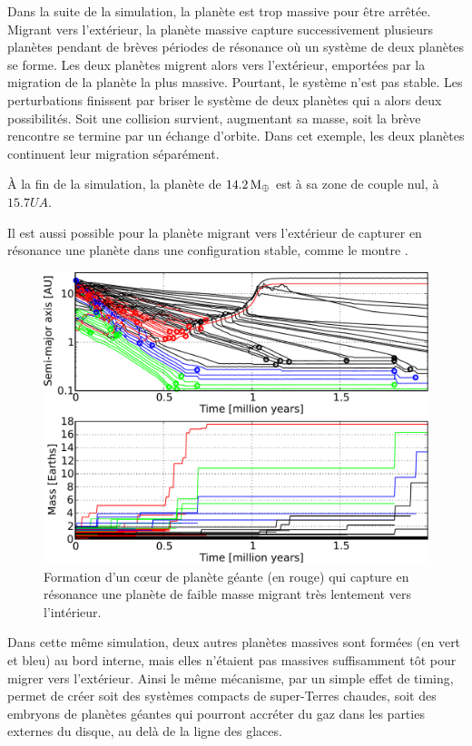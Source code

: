Dans la suite de la simulation, la planète est trop massive pour être arrêtée. Migrant vers l'extérieur, la planète massive
capture successivement plusieurs planètes pendant de brèves périodes de résonance où un système de deux planètes se forme. Les
deux planètes migrent alors vers l'extérieur, emportées par la migration de la planète la plus massive. Pourtant, le système
n'est pas stable. Les perturbations finissent par briser le système de deux planètes qui a alors deux possibilités. Soit une
collision survient, augmentant sa masse, soit la brève rencontre se termine par un échange d'orbite. Dans cet exemple, les deux
planètes continuent leur migration séparément.

À la fin de la simulation, la planète de $14.2\mathrm{\thinspace M_\oplus}$ est à sa zone de couple nul, à $15.7\unit{UA}$. 

\bigskip

Il est aussi possible pour la planète migrant vers l'extérieur de capturer en résonance une planète dans une configuration stable, comme le montre .
\begin{figure}[htbp]
\centering
\includegraphics[width=0.65\linewidth]{figure/HSE/2-body_outward.pdf}
\caption[Un cœur de planète géante capture un embryon en résonance.]{Formation d'un cœur de planète géante (en rouge) qui
capture en résonance une planète de faible masse migrant très lentement vers
l'intérieur.}\label{fig:2-body_outward}%
\end{figure}

Dans cette même simulation, deux autres planètes massives sont formées (en vert et bleu) au bord interne, mais elles n'étaient pas massives suffisamment tôt pour migrer vers l'extérieur. Ainsi le même mécanisme, par un simple effet de timing, permet de créer soit des systèmes compacts de super-Terres chaudes, soit des embryons de planètes géantes qui pourront accréter du gaz dans les parties externes du disque, au delà de la ligne des glaces.

